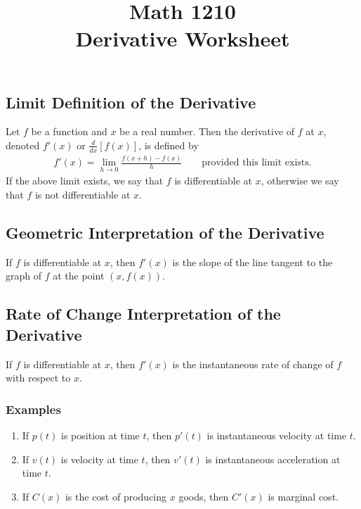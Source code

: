 \documentclass[reqno,psamsfonts]{amsart}
\title{Math 1210\\Derivative Worksheet}
\theoremstyle{definition}
\theoremstyle{remark}
\numberwithin{equation}{section}
\begin{document}
\maketitle
\thispagestyle{empty}
\noindent

\subsection*{Limit Definition of the Derivative}
Let $f$ be a function and $x$ be a real number. Then the derivative of $f$ at $x$, denoted $f'(x)$ or $\frac{d}{dx}[f(x)]$, is defined by
\begin{align*}
f'(x)=\lim\limits_{h\to 0}\frac{f(x+h)-f(x)}{h}\hspace{2em}\text{provided this limit exists.}
\end{align*}
If the above limit exists, we say that $f$ is differentiable at $x$, otherwise we say that $f$ is not differentiable at $x$.

\subsection*{Geometric Interpretation of the Derivative} If $f$ is differentiable at $x$, then $f'(x)$ is the slope of the line tangent to the graph of $f$ at the point $(x, f(x))$.

\subsection*{Rate of Change Interpretation of the Derivative} If $f$ is differentiable at $x$, then $f'(x)$ is the instantaneous rate of change of $f$ with respect to $x$.

\subsubsection*{Examples}
\begin{enumerate}
\item If $p(t)$ is position at time $t$, then $p'(t)$ is instantaneous velocity at time $t$.
\item If $v(t)$ is velocity at time $t$, then $v'(t)$ is instantaneous acceleration at time $t$.
\item If $C(x)$ is the cost of producing $x$ goods, then $C'(x)$ is marginal cost.
\end{enumerate}
\end{document}

